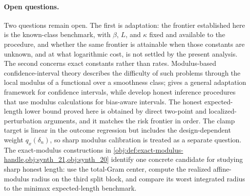 \documentclass[11pt]{article}
\begin{document}
\paragraph{Open questions.}
Two questions remain open.  The first is adaptation: the frontier established here is the known-class benchmark, with \(\beta\), \(L\), and \(\kappa\) fixed and available to the procedure, and whether the same frontier is attainable when those constants are unknown, and at what logarithmic cost, is not settled by the present analysis.  The second concerns exact constants rather than rates. Modulus-based confidence-interval theory describes the difficulty of such problems through the local modulus of a functional over a smoothness class; \citet{Cai2004} gives a general adaptation framework for confidence intervals, while \citet{ArmstrongKolesar2018OptimalInference,ArmstrongKolesar2020} develop honest inference procedures that use modulus calculations for bias-aware intervals. The honest expected-length lower bound proved here is obtained by direct two-point and localized-perturbation arguments, and it matches the risk frontier in order. The clamp target is linear in the outcome regression but includes the design-dependent weight \(q_x(\delta_n)\), so sharp modulus calibration is treated as a separate question. The exact-modulus constructions in \cref{obj:def:exact-modulus-handle,obj:synth_21,obj:synth_20} identify one concrete candidate for studying sharp honest length: use the total-Gram center, compute the realized affine-modulus radius on the third split block, and compare its worst integrated radius to the minimax expected-length benchmark.
\end{document}
